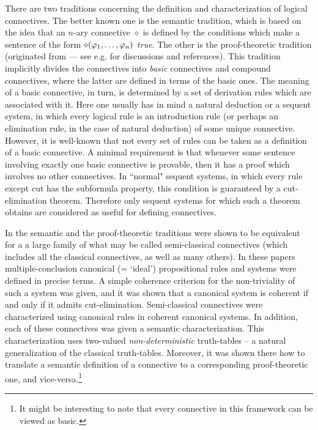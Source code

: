 \documentclass{LMCS}
\theoremstyle{remark}
\newcommand{\fe}{\varphi}
\begin{document}
There are two traditions concerning the definition and 
characterization of logical connectives. 
The better known one is the semantic tradition, which is
based on the idea that an $n$-ary connective $\diamond$
is defined by the conditions which make
a sentence of the form ${\diamond (\fe_1 \til \fe_n)}$ 
{\em true}. The other is the proof-theoretic tradition (originated
from \cite{gentzen69} ---  see e.g.  \cite{handbook-sundholm} for discussions and references).
This tradition implicitly divides the connectives into {\em basic} connectives and compound connectives,
where the latter are defined in terms of the basic ones. 
The meaning of a basic connective, in turn, is determined by 
a set of derivation rules which are associated with it. 
Here one usually has in mind a natural deduction or a sequent system,
in which every logical rule is an introduction rule
(or perhaps an elimination rule, in the case of natural deduction) 
of some unique connective.
However, it is well-known that not every set of rules can be taken as a definition of a 
basic connective. 
A minimal requirement is that whenever some sentence involving exactly one basic connective
is provable, then it has a proof which involves no other connectives.
In ``normal" sequent systems, in which every rule except cut has the subformula property,
this condition is guaranteed by a cut-elimination theorem. Therefore only sequent systems for which
such a theorem obtains are considered as useful for defining connectives.

In \cite{AL05} the semantic and the proof-theoretic traditions were shown to be equivalent
for a a large family of what may be called semi-classical connectives 
(which includes all the classical connectives, as well as many others).
In these papers multiple-conclusion
canonical (= `ideal') propositional rules and systems were defined in precise terms.
A simple coherence criterion for the non-triviality of such a system was given,
and it was shown that a canonical system 
is coherent if and only if it admits cut-elimination.
Semi-classical connectives were characterized using canonical rules in coherent canonical systems.
In addition, each of these connectives was given  
a semantic characterization. This characterization uses  
two-valued {\em non-deterministic} truth-tables -- a
natural generalization of the classical truth-tables. 
Moreover, it was shown there how to translate a semantic definition of a connective 
to a corresponding proof-theoretic one, and vice-versa.\footnote{It might be interesting to note that 
every connective in this framework can be viewed as basic.}
\end{document}
